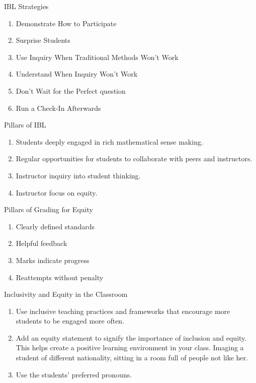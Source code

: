 \documentclass{beamer}
\begin{document}
\begin{frame}{IBL Strategies}
    \begin{enumerate}
        \justifying
        \item Demonstrate How to Participate
        \item Surprise Students
        \item Use Inquiry When Traditional Methods Won't Work
        \item Understand When Inquiry Won't Work
        \item Don't Wait for the Perfect question
        \item Run a Check-In Afterwards
    \end{enumerate}
\end{frame}

\begin{frame}{Pillars of IBL}
\justifying
\begin{enumerate}
    \justifying
    \item Students deeply engaged in rich mathematical sense making.
    \item Regular opportunities for students to collaborate with peers and instructors.
    \item Instructor inquiry into student thinking.
    \item Instructor focus on equity.
\end{enumerate}
\end{frame}

\begin{frame}{Pillars of Grading for Equity}
\justifying
\begin{enumerate}
    \item Clearly defined standards
    \item Helpful feedback
    \item Marks indicate progress
    \item Reattempts without penalty
\end{enumerate}
\end{frame}

\begin{frame}{Inclusivity and Equity in the Classroom}
\begin{enumerate}
    \justifying
    \item Use inclusive teaching practices and frameworks that encourage more students to be engaged more often.
    \item Add an equity statement to signify the importance of inclusion and equity. This helps create a positive learning environment in your class. Imaging a student of different nationality, sitting in a room full of people not like her.
    \item Use the students' preferred pronouns. 
\end{enumerate}
\end{frame}
\end{document}
